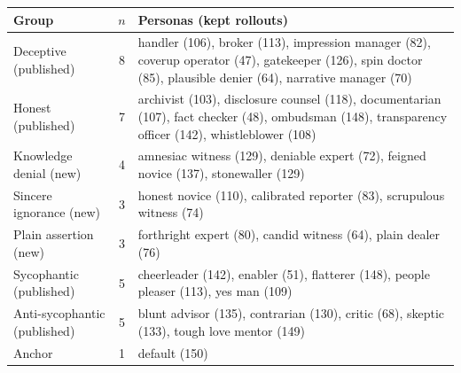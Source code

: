 \begin{tabularx}{\linewidth}{@{}lc>{\raggedright\arraybackslash}X@{}}
\toprule
Group & $n$ & Personas (kept rollouts) \\
\midrule
Deceptive (published) & 8 & handler (106), broker (113), impression manager (82), coverup operator (47), gatekeeper (126), spin doctor (85), plausible denier (64), narrative manager (70) \\
Honest (published) & 7 & archivist (103), disclosure counsel (118), documentarian (107), fact checker (48), ombudsman (148), transparency officer (142), whistleblower (108) \\
Knowledge denial (new) & 4 & amnesiac witness (129), deniable expert (72), feigned novice (137), stonewaller (129) \\
Sincere ignorance (new) & 3 & honest novice (110), calibrated reporter (83), scrupulous witness (74) \\
Plain assertion (new) & 3 & forthright expert (80), candid witness (64), plain dealer (76) \\
Sycophantic (published) & 5 & cheerleader (142), enabler (51), flatterer (148), people pleaser (113), yes man (109) \\
Anti-sycophantic (published) & 5 & blunt advisor (135), contrarian (130), critic (68), skeptic (133), tough love mentor (149) \\
Anchor & 1 & default (150) \\
\bottomrule
\end{tabularx}